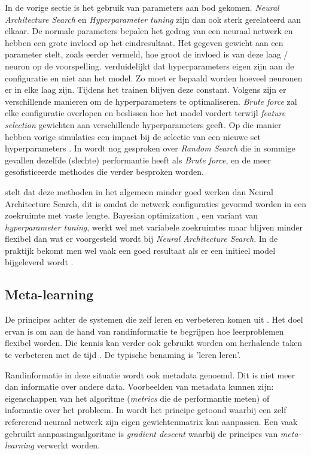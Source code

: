 In de vorige sectie is het gebruik van parameters aan bod gekomen. \textit{Neural Architecture Search} en \textit{Hyperparameter tuning} zijn dan ook sterk gerelateerd aan elkaar. De normale parameters bepalen het gedrag van een neuraal netwerk en hebben een grote invloed op het eindresultaat. Het gegeven gewicht aan een parameter stelt, zoals eerder vermeld, hoe groot de invloed is van deze laag / neuron op de voorspelling. \textcite{GoogleHT2020} verduidelijkt dat hyperparameters eigen zijn aan de configuratie en niet aan het model. Zo moet er bepaald worden hoeveel neuronen er in elke laag zijn. Tijdens het trainen blijven deze constant. Volgens \textcite{Brust2019} zijn er verschillende manieren om de hyperparameters te optimaliseren. \textit{Brute force} zal elke configuratie overlopen en beslissen hoe het model vordert terwijl \textit{feature selection} gewichten aan verschillende hyperparameters geeft. Op die manier hebben vorige simulaties een impact bij de selectie van een nieuwe set hyperparameters \autocite{Claesen2015}. In \textcite{Bergstra2011} wordt nog gesproken over \textit{Random Search} die in sommige gevallen dezelfde (slechte) performantie heeft als \textit{Brute force}, en de meer gesofisticeerde methodes die verder besproken worden. 

\textcite{ZophL2016} stelt dat deze methoden in het algemeen minder goed werken dan Neural Architecture Search, dit is omdat de netwerk configuraties gevormd worden in een zoekruimte met vaste lengte. Bayesian optimization \autocite{Bergstra2013}, een variant van \textit{hyperparameter tuning}, werkt wel met variabele zoekruimtes maar blijven minder flexibel dan wat er voorgesteld wordt bij \textit{Neural Architecture Search}. In de praktijk bekomt men wel vaak een goed resultaat als er een initieel model bijgeleverd wordt \autocite{ZophL2016}.

\subsection{Meta-learning}
\label{subsec:meta-learning}

De principes achter de systemen die zelf leren en verbeteren komen uit \textcite{Schmid1987}. Het doel ervan is om aan de hand van randinformatie te begrijpen hoe leerproblemen flexibel worden. Die kennis kan verder ook gebruikt worden om herhalende taken te verbeteren met de tijd \autocite{ZophL2016}. De typische benaming is 'leren leren'.

Randinformatie in deze situatie wordt ook metadata genoemd. Dit is niet meer dan informatie over andere data. Voorbeelden van metadata kunnen zijn: eigenschappen van het algoritme (\textit{metrics} die de performantie meten) of informatie over het probleem. In \textcite{Schmidhuber1993} wordt het principe getoond waarbij een zelf refererend neuraal netwerk zijn eigen gewichtenmatrix kan aanpassen. Een vaak gebruikt aanpassingsalgoritme is \textit{gradient descent} waarbij de principes van \textit{meta-learning} verwerkt worden.

